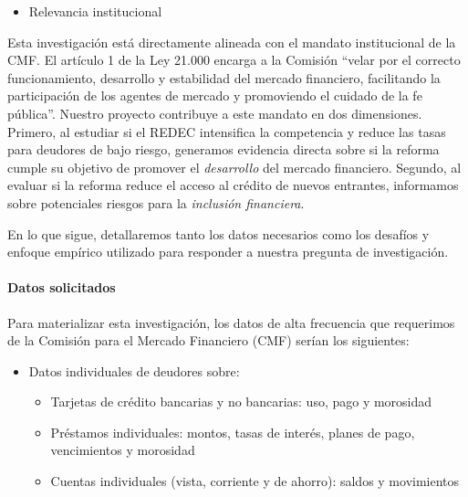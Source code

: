 \documentclass[11pt]{article}
\theoremstyle{plain}
\theoremstyle{plain}
\begin{document}
\begin{itemize}
    \item Relevancia institucional
\end{itemize}
Esta investigación está directamente alineada con el mandato institucional de la CMF. El artículo 1 de la Ley 21.000 encarga a la Comisión ``velar por el correcto funcionamiento, desarrollo y estabilidad del mercado financiero, facilitando la participación de los agentes de mercado y promoviendo el cuidado de la fe pública''. Nuestro proyecto contribuye a este mandato en dos dimensiones. Primero, al estudiar si el REDEC intensifica la competencia y reduce las tasas para deudores de bajo riesgo, generamos evidencia directa sobre si la reforma cumple su objetivo de promover el \textit{desarrollo} del mercado financiero. Segundo, al evaluar si la reforma reduce el acceso al crédito de nuevos entrantes, informamos sobre potenciales riesgos para la \textit{inclusión financiera}.







 





En lo que sigue, detallaremos tanto los datos necesarios como los desafíos y enfoque empírico utilizado para responder a nuestra pregunta de investigación.

\newpage





 

\paragraph{Datos solicitados}


Para materializar esta investigación, 
los datos de alta frecuencia que requerimos de la Comisión para el Mercado Financiero (CMF) serían los siguientes:


\begin{itemize}
    \item Datos individuales de deudores sobre:
    \begin{itemize}
        \item Tarjetas de crédito bancarias y no bancarias: uso, pago y morosidad
        \item Préstamos individuales: montos, tasas de interés, planes de pago, vencimientos y morosidad
        \item Cuentas individuales (vista, corriente y de ahorro): saldos y movimientos
    \end{itemize}
\end{itemize}
\end{document}
